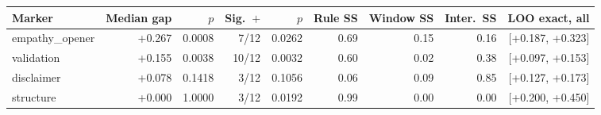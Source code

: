 \begin{tabular}{lrrrrrrrr}
\toprule
Marker & Median gap & $p$ & Sig.\ $+$ & $p$ & Rule SS & Window SS & Inter.\ SS & LOO exact, all \\
\midrule
empathy\_opener & +0.267 & 0.0008 & 7/12 & 0.0262 & 0.69 & 0.15 & 0.16 & [+0.187, +0.323] \\
validation & +0.155 & 0.0038 & 10/12 & 0.0032 & 0.60 & 0.02 & 0.38 & [+0.097, +0.153] \\
disclaimer & +0.078 & 0.1418 & 3/12 & 0.1056 & 0.06 & 0.09 & 0.85 & [+0.127, +0.173] \\
structure & +0.000 & 1.0000 & 3/12 & 0.0192 & 0.99 & 0.00 & 0.00 & [+0.200, +0.450] \\
\bottomrule
\end{tabular}
